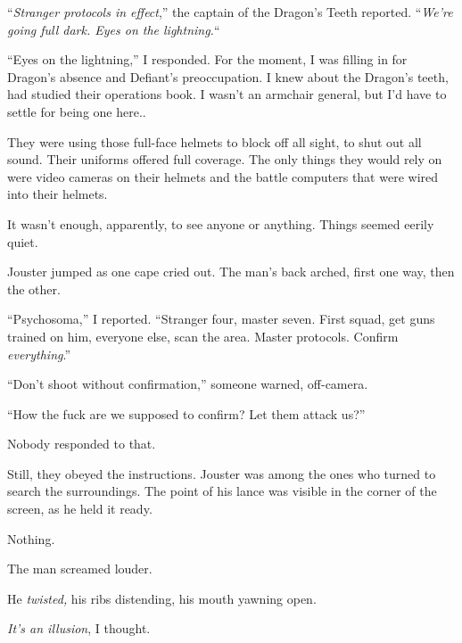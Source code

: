 ``\emph{Stranger protocols in effect},'' the captain of the Dragon's Teeth reported.  ``\emph{We're going full dark.  Eyes on the lightning.}``



``Eyes on the lightning,'' I responded.  For the moment, I was filling in for Dragon's absence and Defiant's preoccupation.  I knew about the Dragon's teeth, had studied their operations book.  I wasn't an armchair general, but I'd have to settle for being one here..



They were using those full-face helmets to block off all sight, to shut out all sound.  Their uniforms offered full coverage.  The only things they would rely on were video cameras on their helmets and the battle computers that were wired into their helmets.



It wasn't enough, apparently, to see anyone or anything.  Things seemed eerily quiet.



Jouster jumped as one cape cried out.  The man's back arched, first one way, then the other.



``Psychosoma,'' I reported.  ``Stranger four, master seven.  First squad, get guns trained on him, everyone else, scan the area.  Master protocols.  Confirm \emph{everything}.''



``Don't shoot without confirmation,'' someone warned, off-camera.



``How the fuck are we supposed to confirm?  Let them attack us?''



Nobody responded to that.



Still, they obeyed the instructions.  Jouster was among the ones who turned to search the surroundings.  The point of his lance was visible in the corner of the screen, as he held it ready.



Nothing.



The man screamed louder.



He \emph{twisted, }his ribs distending, his mouth yawning open.



\emph{It's an illusion}, I thought.




